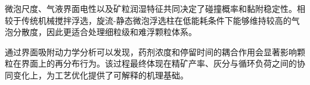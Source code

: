 \label{chap:bubble-particle}


微泡尺度、气液界面电性以及矿粒润湿特征共同决定了碰撞概率和黏附稳定性。相较于传统机械搅拌浮选，旋流-静态微泡浮选柱在低能耗条件下能够维持较高的气泡分散度，因此更适合处理细粒级和难浮颗粒体系。

\vspace{0.4\baselineskip}

通过界面吸附动力学分析可以发现，药剂浓度和停留时间的耦合作用会显著影响颗粒在界面上的再分布行为。该过程最终体现在精矿产率、灰分与循环负荷之间的协同变化上，为工艺优化提供了可解释的机理基础。
